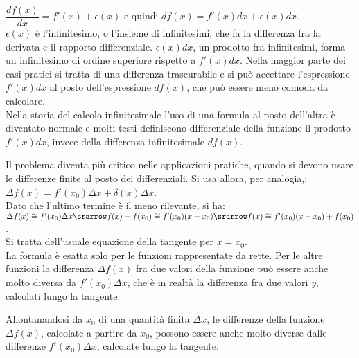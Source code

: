 $\dfrac{df(x)}{dx}=f'(x)+\epsilon(x)$ e quindi $df(x)=f'(x)dx+\epsilon(x)dx$.\\
$\epsilon(x)$ è l'infinitesimo, o l'insieme di infinitesimi, che fa la 
differenza fra la derivata e il rapporto differenziale.  
$\epsilon(x)dx$, un prodotto fra infinitesimi, forma un infinitesimo 
di ordine superiore rispetto a $f'(x)dx$.
Nella maggior parte dei casi pratici si tratta di una differenza trascurabile 
e si può accettare l'espressione $f'(x)dx$ al posto dell'espressione
$df(x)$, che può essere meno comoda da calcolare.\\
Nella storia del calcolo infinitesimale l'uso di una formula al posto dell'altra
è diventato normale e molti testi definiscono differenziale della 
funzione il prodotto $f'(x)dx$, invece della differenza infinitesimale 
$df(x)$.

Il problema diventa più critico nelle applicazioni pratiche, quando si devono 
usare le differenze finite al posto dei differenziali. Si usa allora, per
analogia,:\\
$\Delta f(x)=f'(x_0)\Delta x + \delta(x)\Delta x$.\\
Dato che l'ultimo termine è il meno rilevante, si ha:\\
$\Delta f(x)\cong f'(x_0)\Delta x \srarrow
f(x)-f(x_0)\cong f'(x_0)(x-x_0)\srarrow f(x)\cong f'(x_0)(x-x_0)+ f(x_0)$.\\
Si tratta dell'usuale equazione della tangente per $x=x_0$.\\
La formula è esatta solo per le funzioni rappresentate da rette.
Per le altre funzioni la differenza $\Delta f(x)$ fra due valori della funzione 
può essere anche molto diversa da $f'(x_0)\Delta x$, che è in realtà la 
differenza fra due valori $y$, calcolati lungo la tangente.

\begin{inaccessibleblock}
  \begin{minipage}[]{.4\textwidth}
    \begin{center} \falsodifferenziale \end{center}
 \end{minipage} 
  \hfill
 \begin{minipage}[]{.55\textwidth}
 Allontanandosi da $x_0$ di una quantità finita $\Delta x$, le differenze della
 funzione $\Delta f(x)$, calcolate a partire da $x_0$, possono 
 essere anche molto diverse dalle differenze $f'(x_0)\Delta x$, calcolate lungo
 la tangente.
 \end{minipage}
\end{inaccessibleblock}
\label{}

